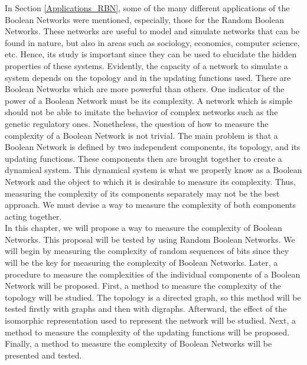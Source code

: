 \label{kolmo_rbn_chapter}
In Section \ref{Applications_RBN}, some of the many different applications of the Boolean Networks were mentioned, especially, those for the Random Boolean Networks. These networks are useful to model and simulate networks that can be found in nature, but also in areas such as sociology, economics, computer science, etc. Hence, its study is important since they can be used to elucidate the hidden properties of these systems. Evidently, the capacity of a network to simulate a system depends on the topology and in the updating functions used. There are Boolean Networks which are more powerful than others. One indicator of the power of a Boolean Network must be its complexity. A network which is simple should not be able to imitate the behavior of complex networks such as the genetic regulatory ones. Nonetheless, the question of how to measure the complexity of a Boolean Network is not trivial. The main problem is that a Boolean Network is defined by two independent components, its topology, and its updating functions. These components then are brought together to create a dynamical system. This dynamical system is what we properly know as a Boolean Network and the object to which it is desirable to measure its complexity. Thus, measuring the complexity of its components separately may not be the best approach. We must devise a way to measure the complexity of both components acting together.\\

In this chapter, we will propose a way to measure the complexity of Boolean Networks. This proposal will be tested by using Random Boolean Networks. We will begin by measuring the complexity of random sequences of bits since they will be the key for measuring the complexity of Boolean Networks. Later, a procedure to measure the complexities of the individual components of a Boolean Network will be proposed. First, a method to measure the complexity of the topology will be studied. The topology is a directed graph, so this method will be tested firstly with graphs and then with digraphs. Afterward, the effect of the isomorphic representation used to represent the network will be studied. Next, a method to measure the complexity of the updating functions will be proposed. Finally, a method to measure the complexity of Boolean Networks will be presented and tested.

